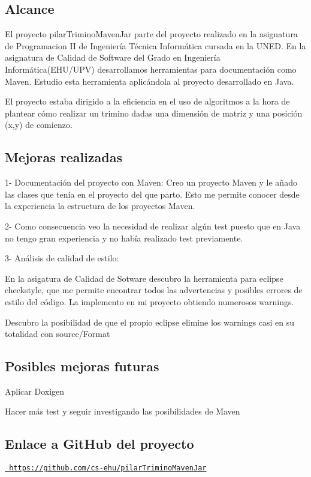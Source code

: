 \subsection*{Alcance}

El proyecto pilar\+Trimino\+Maven\+Jar parte del proyecto realizado en la asignatura de Programacion II de Ingeniería Técnica Informática cursada en la U\+N\+ED. En la asignatura de Calidad de Software del Grado en Ingeniería Informática(E\+H\+U/\+U\+PV) desarrollamos herramientas para documentación como Maven. Estudio esta herramienta aplicándola al proyecto desarrollado en Java.

El proyecto estaba dirigido a la eficiencia en el uso de algoritmos a la hora de plantear cómo realizar un trimino dadas una dimensión de matriz y una posición (x,y) de comienzo.

\subsection*{Mejoras realizadas}

1-\/ Documentación del proyecto con Maven\+: Creo un proyecto Maven y le añado las clases que tenía en el proyecto del que parto. Esto me permite conocer desde la experiencia la estructura de los proyectos Maven.

2-\/ Como consecuencia veo la necesidad de realizar algún test puesto que en Java no tengo gran experiencia y no había realizado test previamente.

3-\/ Análisis de calidad de estilo\+:
\begin{DoxyItemize}
\item En la asigatura de Calidad de Sotware descubro la herramienta para eclipse checkstyle, que me permite encontrar todos las advertencias y posibles errores de estilo del código. La implemento en mi proyecto obtiendo numerosos warnings.
\item Descubro la posibilidad de que el propio eclipse elimine los warnings casi en su totalidad con source/\+Format
\end{DoxyItemize}

\subsection*{Posibles mejoras futuras}


\begin{DoxyItemize}
\item Aplicar Doxigen
\item Hacer más test y seguir investigando las posibilidades de Maven
\end{DoxyItemize}

\subsection*{Enlace a Git\+Hub del proyecto}

\href{https://github.com/cs-ehu/pilarTriminoMavenJar}{\texttt{ https\+://github.\+com/cs-\/ehu/pilar\+Trimino\+Maven\+Jar}} 